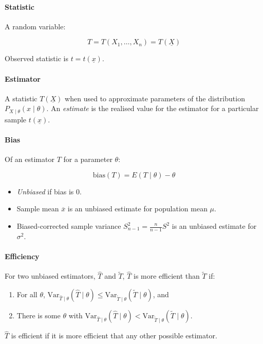\documentclass[twocolumn,english]{article}
\begin{document}
\paragraph{Statistic}

A random variable:

\[
T=T\left(X_{1},\dots,X_{n}\right)=T\left(\underline{X}\right)
\]

Observed statistic is $t=t\left(\underline{x}\right)$.

\paragraph{Estimator}

A statistic $T\left(\underline{X}\right)$ when used to approximate
parameters of the distribution $P_{X\mid\theta}\left(x\mid\theta\right)$.
An \emph{estimate} is the realised value for the estimator for a particular
sample $t\left(\underline{x}\right)$.

\paragraph{Bias}

Of an estimator $T$ for a parameter $\theta$:

\[
\text{bias}\left(T\right)=E\left(T\mid\theta\right)-\theta
\]
\begin{itemize}
\item \emph{Unbiased} if bias is 0.
\item Sample mean $\overline{x}$ is an unbiased estimate for population
mean $\mu$.
\item Biased-corrected sample variance $S_{n-1}^{2}=\frac{n}{n-1}S^{2}$
is an unbiased estimate for $\sigma^{2}$.
\end{itemize}

\paragraph{Efficiency}

For two unbiased estimators, $\hat{T}$ and $\tilde{T}$, $\hat{T}$
is more efficient than $\tilde{T}$ if:
\begin{enumerate}
\item For all $\theta$, $\text{Var}_{\hat{T}\mid\theta}\left(\hat{T}\mid\theta\right)\leq\text{Var}_{\tilde{T}\mid\theta}\left(\tilde{T}\mid\theta\right)$,
and
\item There is some $\theta$ with $\text{Var}_{\hat{T}\mid\theta}\left(\hat{T}\mid\theta\right)<\text{Var}_{\tilde{T}\mid\theta}\left(\tilde{T}\mid\theta\right)$.
\end{enumerate}
$\hat{T}$ is efficient if it is more efficient that any other possible
estimator.
\end{document}
